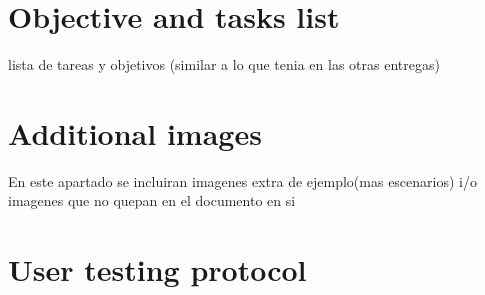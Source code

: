 \documentclass[10pt,a4paper,twocolumn,twoside]{article}
\begin{document}
	
	
	
	\appendix
	
	\section{Objective and tasks list}
	lista de tareas y objetivos (similar a lo que tenia en las otras entregas)
	
	\section{Additional images}
	En este apartado se incluiran imagenes extra de ejemplo(mas escenarios) i/o imagenes que no quepan en el documento en si

	\section{User testing protocol}
\end{document}
